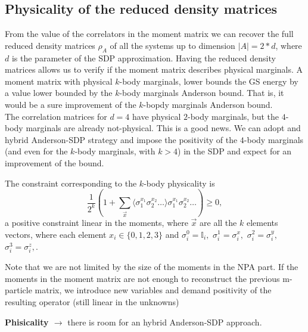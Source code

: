 \documentclass[10pt,a4paper,twoside,twocolumn]{revtex4-1}
\begin{document}
  
\subsection{Physicality of the reduced density matrices}
 From the value of the correlators in the moment matrix we can recover the full reduced density matrices $\rho_A$ of all the systems up to dimension $|A|=2*d$, where $d$ is the parameter of the SDP approximation.
 Having the reduced density matrices allows us to verify if the moment matrix describes physical marginals. A moment matrix with physical $k$-body marginals, lower bounds the GS energy by a value lower bounded by the $k$-body marginals Anderson bound. That is, it would be a sure improvement of the $k$-bopdy marginals Anderson bound.\\
 The correlation matrices for $d=4$ have physical $2$-body marginals, but the $4$-body marginals are already not-physical. This is a good news. We can adopt and hybrid Anderson-SDP strategy and impose the positivity of the $4$-body marginals (and even for the $k$-body marginals, with $k>4$) in the SDP and expect for an improvement of the bound.
 
The constraint corresponding to the $k$-body physicality is
\begin{equation}
\frac{1}{2^k} \left( 1 + \sum_{\vec{x}} \langle \sigma^{x_1}_{1}\sigma^{x_2}_{2}\dots \rangle \sigma^{x_1}_{1}\sigma^{x_2}_{2}\dots \right) \geq 0 ,
\end{equation}
a positive constraint linear in the moments,  where $\vec{x}$ are all the $k$ elements vectors, where each element $x_i \in \{0,1,2,3\}$ and $\sigma^{0}_{i}=\mathbb{I}_{i},$ $\sigma^{1}_{i}=\sigma^{x}_{i},$ $\sigma^{2}_{i}=\sigma^{y}_{i},$ $\sigma^{3}_{i}=\sigma^{z}_{i},$.

Note that we are not limited by the size of the moments in the NPA part. If the moments in the moment matrix are not enough to reconstruct the previous m-particle matrix, we introduce new variables and demand positivity of the resulting operator (still linear in the unknowns)

 
 \textbf{Phisicality $\rightarrow$} there is room for an hybrid Anderson-SDP approach. 
 
 
 
\end{document}

